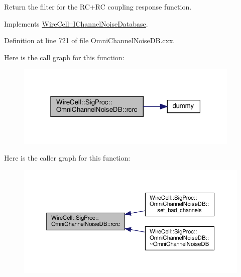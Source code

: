 Return the filter for the R\+C+\+RC coupling response function. 



Implements \hyperlink{class_wire_cell_1_1_i_channel_noise_database_a8f9fa5547062c23f689fde9bb810361b}{Wire\+Cell\+::\+I\+Channel\+Noise\+Database}.



Definition at line 721 of file Omni\+Channel\+Noise\+D\+B.\+cxx.

Here is the call graph for this function\+:
\nopagebreak
\begin{figure}[H]
\begin{center}
\leavevmode
\includegraphics[width=303pt]{class_wire_cell_1_1_sig_proc_1_1_omni_channel_noise_d_b_a0155aba843a5a04966ffcfe556b207f8_cgraph}
\end{center}
\end{figure}
Here is the caller graph for this function\+:
\nopagebreak
\begin{figure}[H]
\begin{center}
\leavevmode
\includegraphics[width=350pt]{class_wire_cell_1_1_sig_proc_1_1_omni_channel_noise_d_b_a0155aba843a5a04966ffcfe556b207f8_icgraph}
\end{center}
\end{figure}
\mbox{\label{class_wire_cell_1_1_sig_proc_1_1_omni_channel_noise_d_b_ae269e377629b9a96c8e0cdb0f30353a4}} 

